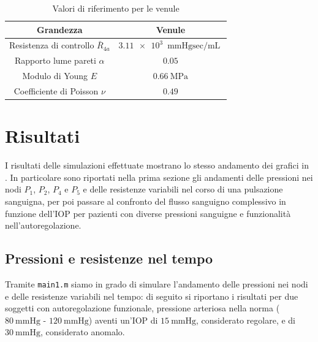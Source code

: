 \documentclass{article}
\begin{document}
\begin{table}[h!]
\begin{center}
\begin{tabular}{| c | c |}
\hline
\textbf{Grandezza} & \textbf{Venule}\\
\hline
Resistenza di controllo $\bar{R}_{4a}$ & $ \SI{3.11e3}{\mmHg \sec \per \milli \liter}$ \\
Rapporto lume pareti $\alpha$ & $0.05$\\
Modulo di Young $E$ & $\SI{0.66}{\mega\pascal}$\\
Coefficiente di Poisson $\nu$ & $0.49$\\
\hline
\end{tabular}
\caption{Valori di riferimento per le venule}
\label{tab_ven}
\end{center}
\end{table}


\section{Risultati}
I risultati delle simulazioni effettuate mostrano lo stesso andamento dei grafici in \cite{art1}.
In particolare sono riportati nella prima sezione gli andamenti delle pressioni nei nodi $P_1$, $P_2$, $P_4$ e $P_5$ e delle resistenze variabili nel corso di una pulsazione sanguigna, per poi passare al confronto del flusso sanguigno complessivo in funzione dell'IOP per pazienti con diverse pressioni sanguigne e funzionalità nell'autoregolazione.

\subsection{Pressioni e resistenze nel tempo}
Tramite \texttt{main1.m} siamo in grado di simulare l'andamento delle pressioni nei nodi e delle resistenze variabili nel tempo: di seguito si riportano i risultati per due soggetti con autoregolazione funzionale, pressione arteriosa nella norma ($\SI{80}{\mmHg}$ - $\SI{120}{\mmHg}$) aventi un'IOP di $\SI{15}{\mmHg}$, considerato regolare, e di $\SI{30}{\mmHg}$, considerato anomalo.
\end{document}
